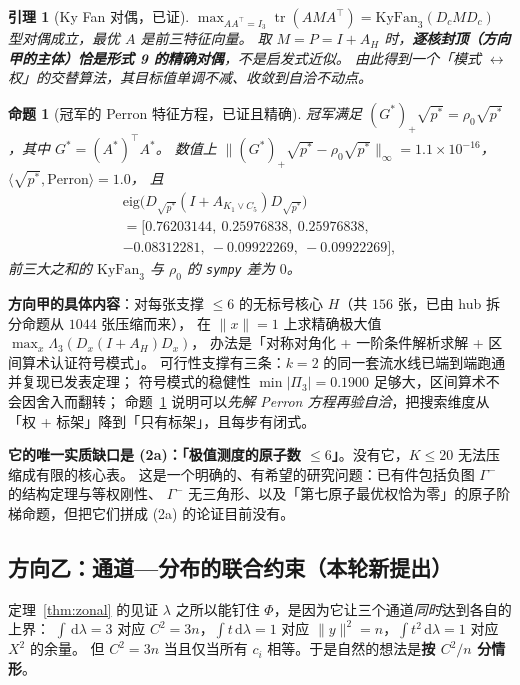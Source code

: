 \documentclass[UTF8,11pt]{ctexart}
\newtheorem{proposition}[theorem]{命题}
\newtheorem{lemma}[theorem]{引理}
\theoremstyle{definition}
\newcommand{\Lam}{\Lambda}
\newcommand{\tr}{\operatorname{tr}}
\newcommand{\dd}{\,\mathrm{d}}
\begin{document}
\begin{lemma}[Ky Fan 对偶，已证]\label{lem:kyfan}
$\max_{AA^\top=I_3}\tr(AMA^\top)=\mathrm{KyFan}_3(D_cMD_c)$ 型对偶成立，最优 $A$ 是前三特征向量。
取 $M=P=I+A_H$ 时，\textbf{逐核封顶（方向甲的主体）恰是形式 9 的精确对偶}，不是启发式近似。
由此得到一个「模式 $\leftrightarrow$ 权」的交替算法，其目标值单调不减、收敛到自洽不动点。
\end{lemma}

\begin{proposition}[冠军的 Perron 特征方程，已证且精确]\label{prop:perron}
冠军满足 $(G^*)_+\sqrt{p^*}=\rho_0\sqrt{p^*}$，其中 $G^*=(A^*)^\top A^*$。
数值上 $\|(G^*)_+\sqrt{p^*}-\rho_0\sqrt{p^*}\|_\infty=1.1\times10^{-16}$，$\langle\sqrt{p^*},\text{Perron}\rangle=1.0$，
且
\begin{multline*}
\mathrm{eig}\bigl(D_{\sqrt{p^*}}(I+A_{K_1\vee C_5})D_{\sqrt{p^*}}\bigr)\\
=\bigl[0.76203144,\ 0.25976838,\ 0.25976838,\\
-0.08312281,\ -0.09922269,\ -0.09922269\bigr],
\end{multline*}
前三大之和的 $\mathrm{KyFan}_3$ 与 $\rho_0$ 的 \texttt{sympy} 差为 $0$。
\end{proposition}

\textbf{方向甲的具体内容}：对每张支撑 $\le6$ 的无标号核心 $H$（共 $156$ 张，已由 hub 拆分命题从 $1044$ 张压缩而来），
在 $\|x\|=1$ 上求精确极大值 $\max_x\Lam_3(D_x(I+A_H)D_x)$，
办法是「对称对角化 + 一阶条件解析求解 + 区间算术认证符号模式」。
可行性支撑有三条：$k=2$ 的同一套流水线已端到端跑通并复现已发表定理；
符号模式的稳健性 $\min|\Pi_3|=0.1900$ 足够大，区间算术不会因舍入而翻转；
命题~\ref{prop:perron} 说明可以\emph{先解 Perron 方程再验自洽}，把搜索维度从「权 + 标架」降到「只有标架」，且每步有闭式。

\textbf{它的唯一实质缺口是 (2a)：「极值测度的原子数 $\le6$」}。没有它，$K\le20$ 无法压缩成有限的核心表。
这是一个明确的、有希望的研究问题：已有件包括负图 $\Gamma^-$ 的结构定理与等权刚性、
$\Gamma^-$ 无三角形、以及「第七原子最优权恰为零」的原子阶梯命题，但把它们拼成 (2a) 的论证目前没有。

\subsection{方向乙：通道—分布的联合约束（本轮新提出）}

定理~\ref{thm:zonal} 的见证 $\lambda$ 之所以能钉住 $\Phi$，是因为它让三个通道\emph{同时}达到各自的上界：
$\int\dd\lambda=3$ 对应 $C^2=3n$，$\int t\dd\lambda=1$ 对应 $\|y\|^2=n$，$\int t^2\dd\lambda=1$ 对应 $X^2$ 的余量。
但 $C^2=3n$ 当且仅当所有 $c_i$ 相等。于是自然的想法是\textbf{按 $C^2/n$ 分情形}。
\end{document}
